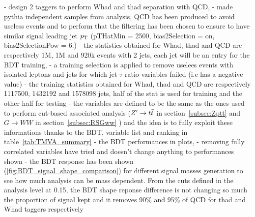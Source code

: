 \documentclass{cernrep}
\begin{document}
- design 2 taggers to perform Whad and thad separation with QCD,
- made pythia independent samples from analysis, QCD has been produced to avoid useless events and to perform that the filtering has been chosen to ensure to have similar signal leading jet $p\sb{\scriptstyle\mathrm{T}}$ (pTHatMin = 2500, bias2Selection = on, bias2SelectionPow = 6.)
- the statistics obtained for Whad, thad and QCD are respectively 1M, 1M and 920k events with 2 jets, each jet will be an entry for the BDT training,
- a training selection is applied to remove uselees events with isolated leptons and jets for which jet $\tau$ ratio variables failed (i.e has a negative value)
- the training statistics obtained for Whad, thad and QCD are respectively 1117500, 1432192 and 1578098 jets, half of the stat is used for training and the other half for testing
- the variables are defined to be the same as the ones used to perform cut-based associated analysis ($Z^{\prime} \rightarrow t\bar{t}$ in section~\ref{subsec:Zptt} and $G \rightarrow WW$ in section~\ref{subsec:RSGww} ) and the idea is to fully exploit these informations thanks to the BDT, variable list and ranking in table~\ref{tab:TMVA_summary}
- the BDT performances in plots, 
- removing fully correlated variables have tried and doesn't change anything to performances shown
- the BDT response has been shown (\ref{fig:BDT_signal_shape_comparison}) for different signal masses generation to see how much analysis can be mass dependent. From the cuts defined in the analysis level at 0.15, the BDT shape reponse difference is not changing so much the proportion of signal kept and it removes 90\% and 95\% of QCD for thad and Whad taggers respectively
\end{document}
